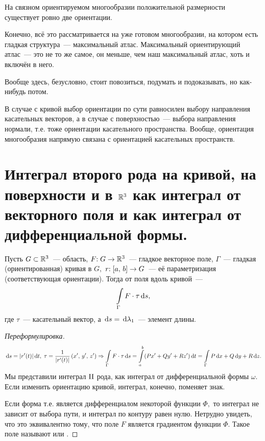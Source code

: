 \documentclass{notes}
\newcommand{\II}{\mr{II}}
\begin{document}
	\begin{st}
		На связном ориентируемом многообразии положительной размерности существует ровно две ориентации.
	\end{st}

	\begin{rem}
		Конечно, всё это рассматривается на уже готовом многообразии, на котором есть гладкая структура~--- максимальный атлас. Максимальный ориентирующий атлас~--- это не то же самое, он меньше, чем наш максимальный атлас, хоть и включён в него.

		Вообще здесь, безусловно, стоит повозиться, подумать и подоказывать, но как-нибудь потом.
	\end{rem}

	\begin{rem}
		В случае с кривой выбор ориентации по сути равносилен выбору направления касательных векторов, а в случае с поверхностью~--- выбора направления нормали, т.е. тоже ориентации касательного пространства. Вообще, ориентация многообразия напрямую связана с ориентацией касательных пространств.
	\end{rem}

\section{Интеграл второго рода на кривой, на поверхности и в $\mathbb{R}^3$ как интеграл от векторного поля и как интеграл от дифференциальной формы.}

	\begin{de}
		Пусть $G \subset \mathbb{R}^3$~--- область, $F \text{\text{:}} \; G \to \mathbb{R}^3$~--- гладкое векторное поле, $\Gamma$~--- гладкая (ориентированная) кривая в $G,$ $r\text{\text{:}}\; [a, \, b] \to G$~--- её параметризация (соответствующая ориентации). Тогда \ti{интеграл $\II$ рода} от поля вдоль кривой~---
		\[
			\int\limits_{\Gamma} F\cdot \tau \, \mathrm{d} s,
		\]
		где $\tau$~--- касательный вектор, а $\, \mathrm{d} s = \, \mathrm{d} \lambda_1$~--- элемент длины.
		\begin{proof}[Переформулировка]
			\[
				\, \mathrm{d} s = |r'(t)| \, \mathrm{d} t, \; \tau = \dfrac{1}{|r'(t)|} \left(x', \, y', \, z'\right) \Rightarrow \int\limits_{\Gamma} F\cdot \tau \, \mathrm{d} s = \int\limits_a^b (Px' + Qy' + Rz') \, \mathrm{d} t = \int\limits_{\Gamma} P \, \mathrm{d} x + Q \, \mathrm{d} y + R \, \mathrm{d} z.
			\]
			Мы представили интеграл $\II$ рода, как интеграл от дифференциальной формы $\omega$. Если изменить ориентацию кривой, интеграл, конечно, поменяет знак. 

			Если форма  т.е. является дифференциалом некоторой функции $\Phi,$ то интеграл не зависит от выбора пути, и интеграл по контуру равен нулю. Нетрудно увидеть, что это эквивалентно тому, что поле $F$ является градиентом функции $\Phi$. Такое поле называют  или .
		\end{proof}
	\end{de}
\end{document}
